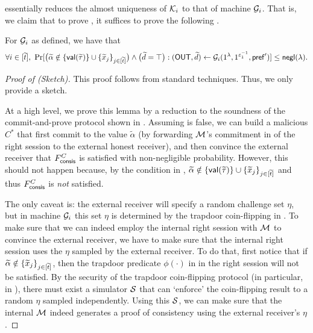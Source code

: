  essentially reduces the almost uniqueness of $\mathcal{K}_i$ to that of machine $\mathcal{G}_i$. That is, we claim that to prove , it suffices to prove the following .
\begin{lemma}\label{pq:claim:Gi:lb:soundness}
 For $\mathcal{G}_i$ as defined, we have that
$$\forall i\in [\widetilde{t}],~ \Pr[\big(\widetilde{\alpha} \notin \{\mathsf{val}(\widetilde{\tau})\} \cup \{\widetilde{x}_j\}_{j \in [\widetilde{t}]}\big) \wedge \big( \widetilde{d} = \top\big):(\mathsf{OUT},\widetilde{d}) \gets \mathcal{G}_i{(1^\lambda, 1^{\varepsilon_1^{-1}},  \mathsf{pref}')}] \leq  \mathsf{negl}(\lambda).$$
\end{lemma}
\begin{proof}[Proof of  (Sketch)]
This proof follows from standard techniques. Thus, we only provide a sketch.

At a high level, we prove this lemma by a reduction to the soundness of the commit-and-prove protocol shown in . Assuming  is false, we can build a malicious $C^*$ that first commit to the value $\tilde{\alpha}$ (by forwarding $\mathcal{M}$'s commitment in  of the right session to the external honest receiver), and then convince the external receiver that $F^C_{\mathsf{consis}}$ is satisfied with non-negligible probability. However, this should not happen because, by the condition in , $\widetilde{\alpha} \notin \{\mathsf{val}(\widetilde{\tau})\} \cup \{\widetilde{x}_j\}_{j \in [\widetilde{t}]}$ and thus $F^C_{\mathsf{consis}}$ is {\em not} satisfied. 

The only caveat is: the external receiver will specify a random challenge set $\eta$, but in machine $\mathcal{G}_i$ this set $\eta$ is determined by the trapdoor coin-flipping in . To make sure that we can indeed employ the internal right session with $\mathcal{M}$ to convince the external receiver, we have to make sure that the internal right session uses the $\eta$ sampled by the external receiver. To do that, first notice that if $\widetilde{\alpha} \notin \{\widetilde{x}_j\}_{j \in [\widetilde{t}]}$, then the trapdoor predicate $\phi(\cdot)$ in  in the right session will not be satisfied. By the security of the trapdoor coin-flipping protocol (in particular,  in ), there must exist a simulator $\mathcal{S}$ that can `enforce' the coin-flipping result to a random $\eta$ sampled independently. Using this $\mathcal{S}$, we can make sure that the internal $\mathcal{M}$ indeed generates a proof of consistency using the external receiver's $\eta$.

\end{proof}

